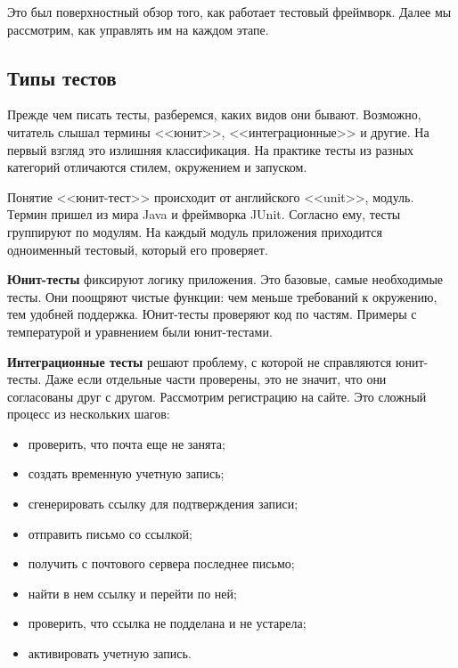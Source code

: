 Это был поверхностный обзор того, как работает тестовый фреймворк. Далее мы
рассмотрим, как управлять им на каждом этапе.

\subsection{Типы тестов}

Прежде чем писать тесты, разберемся, каких видов они бывают. Возможно, читатель
слышал термины <<юнит>>, <<интеграционные>> и другие. На первый взгляд это
излишняя классификация. На практике тесты из разных категорий отличаются стилем,
окружением и запуском.

Понятие <<юнит-тест>> происходит от английского <<unit>>, модуль. Термин пришел
из мира Java и фреймворка JUnit. Согласно ему, тесты группируют по модулям. На
каждый модуль приложения приходится одноименный тестовый, который его проверяет.

\textbf{Юнит-тесты} фиксируют логику приложения. Это базовые, самые необходимые
тесты. Они поощряют чистые функции: чем меньше требований к окружению, тем
удобней поддержка. Юнит-тесты проверяют код по частям. Примеры с температурой и
уравнением были юнит-тестами.

\textbf{Интеграционные тесты} решают проблему, с которой не справляются
юнит-тесты. Даже если отдельные части проверены, это не значит, что они
согласованы друг с другом. Рассмотрим регистрацию на сайте. Это сложный процесс
из нескольких шагов:

\begin{itemize}

\item
  проверить, что почта еще не занята;

\item
  создать временную учетную запись;

\item
  сгенерировать ссылку для подтверждения записи;

\item
  отправить письмо со ссылкой;

\item
  получить с почтового сервера последнее письмо;

\item
  найти в нем ссылку и перейти по ней;

\item
  проверить, что ссылка не подделана и не устарела;

\item
  активировать учетную запись.

\end{itemize}

